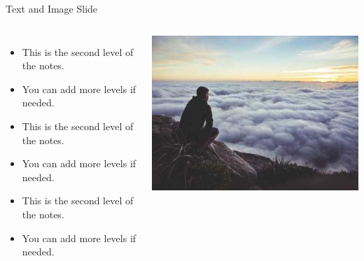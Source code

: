 \documentclass[aspectratio=169, notes]{beamer}
\begin{document}
\begin{frame}[shrink]{Text and Image Slide}
    \begin{columns}
        \begin{itemize}
            \item This is the second level of the notes.
            \item You can add more levels if needed.
            \item This is the second level of the notes.
            \item You can add more levels if needed.
            \item This is the second level of the notes.
            \item You can add more levels if needed.
        \end{itemize}
        \includegraphics[height=0.5\textheight]{Images/image1.jpg}
    \end{columns}
    \vspace*{1cm}


\end{frame}
\end{document}
